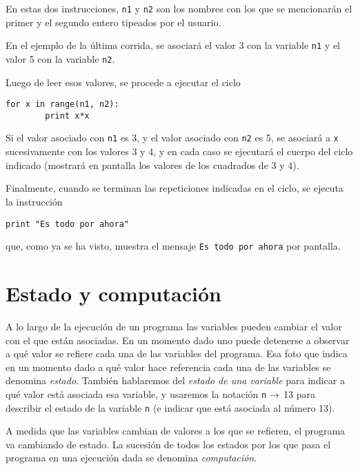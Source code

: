 En estas dos instrucciones, \lstinline+n1+ y \lstinline+n2+ son los
nombres con los que se mencionarán el primer y el segundo entero
tipeados por el usuario.

En el ejemplo de la última corrida, se asociará el valor 3 con la
variable \lstinline+n1+ y el valor 5 con la variable \lstinline+n2+.

Luego de leer esos valores, se procede a ejecutar el ciclo

\begin{lstlisting}[firstnumber=11]
    for x in range(n1, n2):
        print x*x
\end{lstlisting}

Si el valor asociado con \lstinline!n1! es 3, y el valor asociado con
\lstinline!n2! es 5, se asociará a \lstinline!x! sucesivamente con los valores
3 y 4, y en cada caso se ejecutará el cuerpo del ciclo indicado (mostrará en
pantalla los valores de los cuadrados de 3 y 4).

Finalmente, cuando se terminan las repeticiones indicadas en el ciclo, se
ejecuta la instrucción

\begin{lstlisting}[firstnumber=14]
	print "Es todo por ahora"
\end{lstlisting}

que, como ya se ha visto, muestra el mensaje \lstinline!Es todo por ahora! por
pantalla.

%
%

\section{Estado y computación}

A lo largo de la ejecución de un programa las variables pueden
cambiar el valor con el que están asociadas. En un momento dado
uno puede detenerse a observar a qué valor se refiere cada una de
las variables del programa. Esa foto que indica en un momento dado
a qué valor hace referencia cada una de las variables se denomina
{\it estado}. También hablaremos del {\it estado de una variable}
para indicar a qué valor está asociada esa variable, y usaremos la
notación \lstinline!n! $\rightarrow$ 13 para describir el estado de la variable
\lstinline!n! (e indicar que está asociada al número 13).

A medida que las variables cambian de valores a los que se
refieren, el programa va cambiando de estado. La sucesión de todos
los estados por los que pasa el programa en una ejecución dada se
denomina {\it computación}.

